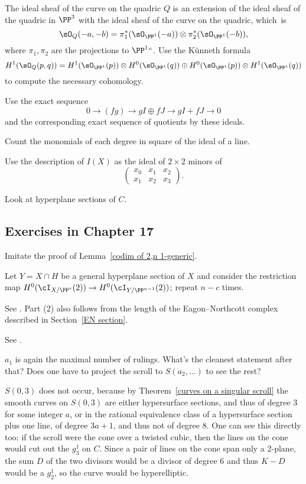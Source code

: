 The ideal sheaf of the curve on the quadric $Q$ is an extension
%
of the ideal sheaf of the quadric in $\PP^3$
with the ideal sheaf of the curve on the quadric, which~is
$$
\sO_Q(-a,-b) = \pi_1^*(\sO_{\PP^1}(-a)) \otimes \pi_2^*(\sO_{\PP^1}(-b)),
$$
where $\pi_1, \pi_2$ are the projections to $\PP^1` `$. Use the
%
K\"unneth formula
$$
H^1(\sO_Q(p,q)) = H^1(\sO_{\PP^1}(p)) \otimes H^0(\sO_{\PP^1}(q)) \oplus
H^0(\sO_{\PP^1}(p)) \otimes H^1(\sO_{\PP^1}(q))
$$
to compute the necessary cohomology.

Use the exact sequence
$$
0\to (fg) \to gI \oplus fJ \to gI+fJ \to 0
$$
and the corresponding exact sequence of quotients by these ideals.

Count the monomials of each degree in square of the ideal of a line.

Use the description of $I(X)$ as the ideal of $2\times 2$ minors of
$$
\begin{pmatrix}
x_0 &x_1&x_2\\
x_1& x_2& x_3
\end{pmatrix}
.
$$

Look at hyperplane sections of $C$.

\subsection*{Exercises in Chapter 17\nopunct}

Imitate the proof of Lemma~\ref{codim of 2,n 1-generic}.

Let $Y = X \cap H$ be a general hyperplane section of $X$
and consider the restriction map $H^0(\cI_{X/\PP^r}(2)) \to
H^0(\cI_{Y/\PP^{n-1}}(2))$; repeat $n-c$ times.

See \cite[Section V.1]{Hartshorne1977}.
Part (2) also follows from
the length of the 
%
Eagon--Northcott complex
described in Section~\ref{EN section}.

See \cite[Section 3c]{Montreal}.

$a_1$ is again the maximal number of rulings. What's the cleanest
statement after that? Does one have
to project the scroll to $S(a_2, \dots)$ to see the rest?

$S(0,3)$ does not occur, because by Theorem~\ref{curves on a
singular scroll} the smooth curves on $S(0,3)$ are either hypersurface
sections, and thus of degree $3$ for
some integer $a$, or in the rational equivalence class of a hypersurface
section plus one line,
of degree $3a+1$, and thus not of degree 8. One can see this directly too:
if the scroll were the cone over
a twisted cubic, then the lines on the cone would cut out the $g^1_3$
on $C$. Since a pair of lines on the cone span
only a 2-plane, the sum $D$ of the two divisors would be a divisor of
degree 6  and thus $K-D$ would be a $g^1_2$,
so the curve would be hyperelliptic.

